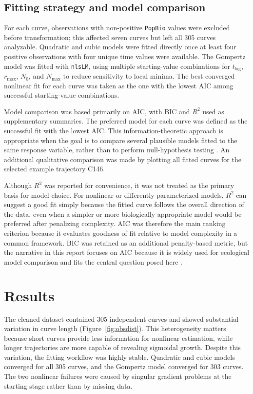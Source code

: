 \documentclass[11pt]{article}
\begin{document}
\subsection{Fitting strategy and model comparison}
For each curve, observations with non-positive \texttt{PopBio} values were excluded before transformation; this affected seven curves but left all 305 curves analyzable. Quadratic and cubic models were fitted directly once at least four positive observations with four unique time values were available. The Gompertz model was fitted with \texttt{nlsLM}, using multiple starting-value combinations for $t_{\mathrm{lag}}$, $r_{\max}$, $N_0$, and $N_{\max}$ to reduce sensitivity to local minima. The best converged nonlinear fit for each curve was taken as the one with the lowest AIC among successful starting-value combinations.

Model comparison was based primarily on AIC, with BIC and $R^2$ used as supplementary summaries. The preferred model for each curve was defined as the successful fit with the lowest AIC. This information-theoretic approach is appropriate when the goal is to compare several plausible models fitted to the same response variable, rather than to perform null-hypothesis testing \citep{Johnson2004}. An additional qualitative comparison was made by plotting all fitted curves for the selected example trajectory C146.

Although $R^2$ was reported for convenience, it was not treated as the primary basis for model choice. For nonlinear or differently parameterized models, $R^2$ can suggest a good fit simply because the fitted curve follows the overall direction of the data, even when a simpler or more biologically appropriate model would be preferred after penalizing complexity. AIC was therefore the main ranking criterion because it evaluates goodness of fit relative to model complexity in a common framework. BIC was retained as an additional penalty-based metric, but the narrative in this report focuses on AIC because it is widely used for ecological model comparison and fits the central question posed here \citep{Johnson2004}.

\section{Results}
The cleaned dataset contained 305 independent curves and showed substantial variation in curve length (Figure~\ref{fig:obsdist}). This heterogeneity matters because short curves provide less information for nonlinear estimation, while longer trajectories are more capable of revealing sigmoidal growth. Despite this variation, the fitting workflow was highly stable. Quadratic and cubic models converged for all 305 curves, and the Gompertz model converged for 303 curves. The two nonlinear failures were caused by singular gradient problems at the starting stage rather than by missing data.
\end{document}
